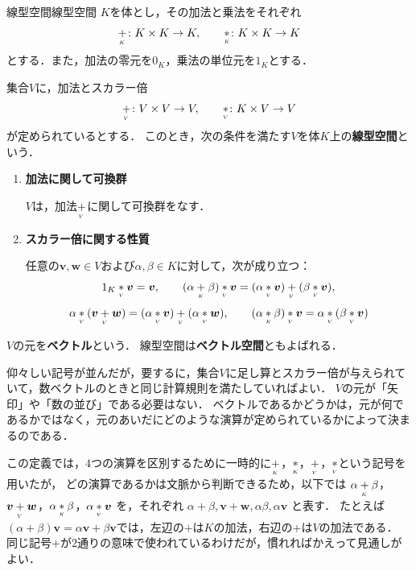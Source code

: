 \begin{definition}{線型空間}{線型空間}
  $K$を体とし，その加法と乗法をそれぞれ
  \[
    \Kadd\colon K\times K\to K,
    \qquad
    \Kmul\colon K\times K\to K
  \]
  とする．また，加法の零元を$0_K$，乗法の単位元を$1_K$とする．

  集合$V$に，加法とスカラー倍
  \[
    \Vadd\colon V\times V\to V,
    \qquad
    \scalmul\colon K\times V\to V
  \]
  が定められているとする．
  このとき，次の条件を満たす$V$を体$K$上の\textbf{線型空間}という．

  \begin{enumerate}[label=(\roman*),leftmargin=3.2em]
    \item \textbf{加法に関して可換群}

    $V$は，加法$\Vadd$に関して可換群をなす．

    \item \textbf{スカラー倍に関する性質}

    任意の$\bm{v},\bm{w}\in V$および$\alpha,\beta\in K$に対して，次が成り立つ：
    \[
      1_K\scalmul\bm{v}=\bm{v},
      \qquad
      (\alpha\Kadd\beta)\scalmul\bm{v}
      =
      (\alpha\scalmul\bm{v})\Vadd(\beta\scalmul\bm{v}),
    \]
    \[
      \alpha\scalmul(\bm{v}\Vadd\bm{w})
      =
      (\alpha\scalmul\bm{v})\Vadd(\alpha\scalmul\bm{w}),
      \qquad
      (\alpha\Kmul\beta)\scalmul\bm{v}
      =
      \alpha\scalmul(\beta\scalmul\bm{v})
    \]
  \end{enumerate}

  $V$の元を\textbf{ベクトル}という．
  線型空間は\textbf{ベクトル空間}ともよばれる．
\end{definition}

仰々しい記号が並んだが，要するに，集合$V$に足し算とスカラー倍が与えられていて，数ベクトルのときと同じ計算規則を満たしていればよい．
$V$の元が「矢印」や「数の並び」である必要はない．
ベクトルであるかどうかは，元が何であるかではなく，元のあいだにどのような演算が定められているかによって決まるのである．

この定義では，$4$つの演算を区別するために一時的に$\Kadd$，$\Kmul$，$\Vadd$，$\scalmul$という記号を用いたが，
どの演算であるかは文脈から判断できるため，以下では
$\alpha\Kadd\beta$，$\bm{v}\Vadd\bm{w}$，$\alpha\Kmul\beta$，$\alpha\scalmul\bm{v}$
を，それぞれ
$\alpha+\beta,\bm{v}+\bm{w},\alpha\beta,\alpha\bm{v}$
と表す．
たとえば$(\alpha+\beta)\bm{v}=\alpha\bm{v}+\beta\bm{v}$では，左辺の$+$は$K$の加法，右辺の$+$は$V$の加法である．
同じ記号$+$が$2$通りの意味で使われているわけだが，慣れればかえって見通しがよい．

